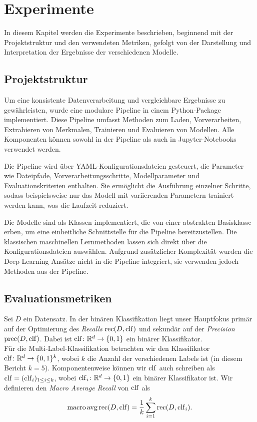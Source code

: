 \section{Experimente}
In diesem Kapitel werden die Experimente beschrieben, beginnend mit der Projektstruktur und den verwendeten Metriken, gefolgt von der Darstellung und Interpretation der Ergebnisse der verschiedenen Modelle.

\subsection{Projektstruktur}
\label{sec:projektstruktur}
Um eine konsistente Datenverarbeitung und vergleichbare Ergebnisse zu gewährleisten, wurde eine modulare Pipeline in einem Python-Package implementiert. Diese Pipeline umfasst Methoden zum Laden, Vorverarbeiten, Extrahieren von Merkmalen, Trainieren und Evaluieren von Modellen. Alle Komponenten können sowohl in der Pipeline als auch in Jupyter-Notebooks verwendet werden.

Die Pipeline wird über YAML-Konfigurationsdateien gesteuert, die Parameter wie Dateipfade, Vorverarbeitungsschritte, Modellparameter und Evaluationskriterien enthalten. Sie ermöglicht die Ausführung einzelner Schritte, sodass beispielsweise nur das Modell mit variierenden Parametern trainiert werden kann, was die Laufzeit reduziert.

Die Modelle sind als Klassen implementiert, die von einer abstrakten Basisklasse erben, um eine einheitliche Schnittstelle für die Pipeline bereitzustellen. Die klassischen maschinellen Lernmethoden lassen sich direkt über die Konfigurationsdateien auswählen. Aufgrund zusätzlicher Komplexität wurden die Deep Learning Ansätze nicht in die Pipeline integriert, sie verwenden jedoch Methoden aus der Pipeline.

\subsection{Evaluationsmetriken}
\label{sec:evaluationsmetriken}
Sei $D$ ein Datensatz. In der binären Klassifikation liegt unser Hauptfokus primär auf der Optimierung des \textit{Recalls} $\operatorname{rec}(D, \operatorname{clf})$ und sekundär auf der \textit{Precision} $\operatorname{prec}(D, \operatorname{clf})$. Dabei ist $\operatorname{clf}\colon\mathbb{R}^d\to \{0, 1\}$ ein binärer Klassifikator.\\

Für die Multi-Label-Klassifikation betrachten wir den Klassifikator $\operatorname{clf}\colon\mathbb{R}^d\to\{0, 1\}^k$, wobei $k$ die Anzahl der verschiedenen Labels ist (in diesem Bericht $k=5$). Komponentenweise können wir $\operatorname{clf}$ auch schreiben als $\operatorname{clf} = (\operatorname{clf}_i)_{1\leq i\leq k}$, wobei $\operatorname{clf}_i\colon\mathbb{R}^d\to\{0, 1\}$ ein binärer Klassifikator ist. Wir definieren den \textit{Macro Average Recall} von $\operatorname{clf}$ als
\begin{equation*}
    \operatorname{macro\,avg\,rec}(D, \operatorname{clf}) = \frac{1}{k}\sum_{i=1}^k\operatorname{rec} (D, \operatorname{clf}_i).
\end{equation*}

